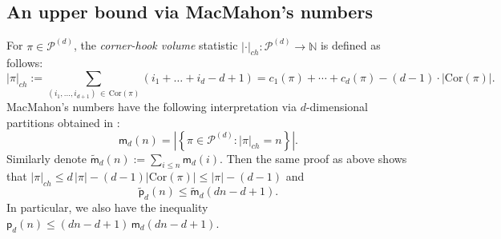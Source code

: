 \documentclass[12pt]{amsart}
\theoremstyle{definition}
\theoremstyle{remark}
\begin{document}
\subsection{An upper bound via MacMahon's numbers}\label{secmac}
For $\pi \in \mathcal{P}^{(d)}$, the {\it corner-hook volume} statistic $|\cdot|_{ch} : \mathcal{P}^{(d)} \to \mathbb{N}$ is defined as follows:
$$
|\pi|_{ch} := \sum_{(i_1,\ldots , i_{d+1})\, \in\, \mathrm{Cor}(\pi)} (i_1 +\ldots + i_d - d + 1) = c_{1}(\pi) + \cdots + c_{d}(\pi) - (d-1)\cdot |\mathrm{Cor}(\pi)|.
$$
MacMahon's numbers have the following interpretation via $d$-dimensional partitions obtained in \cite{ay}:
$$
\mathsf{m}_d(n) = \left| \left\{\pi \in \mathcal{P}^{(d)} : |\pi|_{ch} = n \right\} \right|.
$$
Similarly denote 
$
\widetilde{\mathsf{m}}_d(n) := \sum_{i \le n}^{} \mathsf{m}_d(i). %
$
Then the same proof as above shows that $|\pi|_{ch} \le d\, |\pi| - (d - 1) |\mathrm{Cor}(\pi)| \le |\pi| - (d - 1)$ and 
$$
\widetilde{\mathsf{p}}_d(n) \le \widetilde{\mathsf{m}}_d(dn - d + 1).
$$
In particular, we also have the inequality $\mathsf{p}_d(n) \le (dn - d + 1)\, \mathsf{m}_d(dn - d + 1)$. 




\
\end{document}
